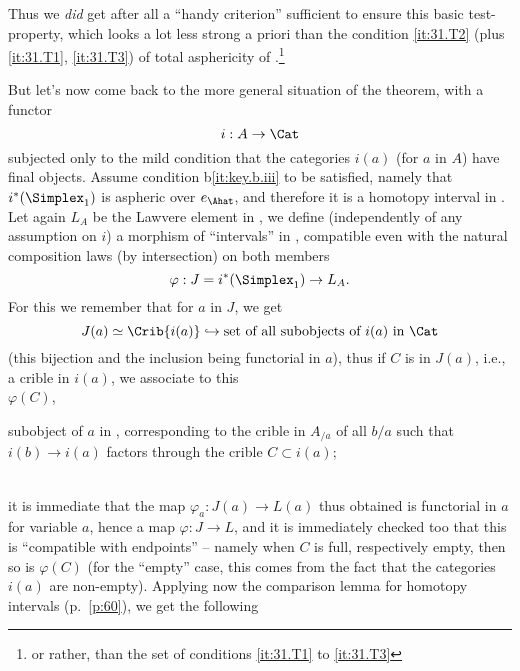Thus we \emph{did} get after all a ``handy criterion'' sufficient to ensure
this basic test-property, which looks a lot less strong a priori than
the condition \ref{it:31.T2} (plus \ref{it:31.T1}, \ref{it:31.T3}) of total asphericity of
\Ahat.\footnote{ or rather, than the set of conditions
  \ref{it:31.T1} to \ref{it:31.T3}}

But let's now come back to the more general situation of the theorem,
with a functor
\[ i : A \to \Cat\]
subjected only to the mild condition that the categories $i(a)$ (for
$a$ in $A$) have final objects. Assume condition b\ref{it:key.b.iii}
to be satisfied, namely that $i^*(\Simplex_1)$ is aspheric over
$e_\Ahat$, and therefore it is a homotopy interval in \Ahat. Let again
$L_A$ be the Lawvere element in \Ahat, we define (independently of any
assumption on $i$) a morphism of ``intervals'' in \Ahat, compatible
even with the natural composition laws (by intersection) on both
members
\[\varphi : J=i^*(\Simplex_1) \to L_A.\]
For this we remember that for $a$ in $J$, we get
\[ J(a) \simeq \Crib{i(a)} \hookrightarrow \text{set of all subobjects
  of $i(a)$ in \Cat}\]
(this bijection and the inclusion being functorial in $a$), thus if
$C$ is in $J(a)$, i.e., a crible in $i(a)$, we associate to this
    \\[\baselineskip]%
  \hspace*{3em}$\varphi(C)$, \quad%
\parbox[t]{0.7\textwidth}{subobject of $a$ in \Ahat,
  corresponding to the crible in $A_{/a}$ of all $b/a$ such that
  $i(b)\to i(a)$ factors through the crible $C\subset i(a)$;}
  \\[\baselineskip]%
it is immediate that the map $\varphi_a : J(a)\to L(a)$ thus obtained
is functorial in $a$ for variable $a$, hence a map $\varphi : J\to L$,
and it is immediately checked too that this is ``compatible with
endpoints'' -- namely when $C$ is full, respectively empty, then so is
$\varphi(C)$ (for the ``empty'' case, this comes from the fact that
the categories $i(a)$ are non-empty). Applying now the comparison lemma
for homotopy intervals (p.~\ref{p:60}), we get the
following

